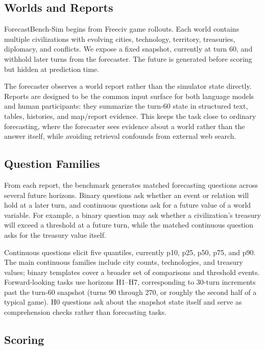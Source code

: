 \documentclass{article}
\begin{document}
\subsection{Worlds and Reports}

ForecastBench-Sim begins from Freeciv game rollouts. Each world contains multiple civilizations with evolving cities, technology, territory, treasuries, diplomacy, and conflicts. We expose a fixed snapshot, currently at turn 60, and withhold later turns from the forecaster. The future is generated before scoring but hidden at prediction time.

The forecaster observes a world report rather than the simulator state directly. Reports are designed to be the common input surface for both language models and human participants: they summarize the turn-60 state in structured text, tables, histories, and map/report evidence. This keeps the task close to ordinary forecasting, where the forecaster sees evidence about a world rather than the answer itself, while avoiding retrieval confounds from external web search.



\subsection{Question Families}

From each report, the benchmark generates matched forecasting questions across several future horizons. Binary questions ask whether an event or relation will hold at a later turn, and continuous questions ask for a future value of a world variable. For example, a binary question may ask whether a civilization's treasury will exceed a threshold at a future turn, while the matched continuous question asks for the treasury value itself.

Continuous questions elicit five quantiles, currently p10, p25, p50, p75, and p90. The main continuous families include city counts, technologies, and treasury values; binary templates cover a broader set of comparisons and threshold events. Forward-looking tasks use horizons H1--H7, corresponding to 30-turn increments past the turn-60 snapshot (turns 90 through 270, or roughly the second half of a typical game). H0 questions ask about the snapshot state itself and serve as comprehension checks rather than forecasting tasks.

\subsection{Scoring}
\end{document}
